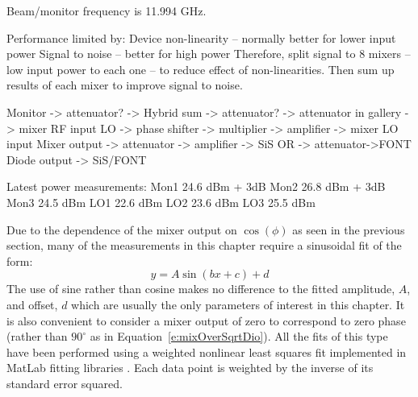 Beam/monitor frequency is 11.994 GHz.

Performance limited by:
Device non-linearity -- normally better for lower input power
Signal to noise -- better for high power
Therefore, split signal to 8 mixers -- low input power to each one -- to reduce effect of non-linearities. Then sum up results of each mixer to improve signal to noise.

Monitor -> attenuator? -> Hybrid sum -> attenuator? -> attenuator in gallery -> mixer RF input
LO -> phase shifter -> multiplier -> amplifier -> mixer LO input
Mixer output -> attenuator -> amplifier -> SiS OR -> attenuator->FONT
Diode output -> SiS/FONT

Latest power measurements:
Mon1 24.6 dBm + 3dB
Mon2 26.8 dBm + 3dB
Mon3 24.5 dBm
LO1 22.6 dBm
LO2 23.6 dBm
LO3 25.5 dBm


Due to the dependence of the mixer output on \(\cos(\phi)\) as seen in the previous section, many of the measurements in this chapter require a sinusoidal fit of the form:
\begin{equation}
y = A\sin(bx + c) + d
\label{e:generalSinEq}
\end{equation}
The use of sine rather than cosine makes no difference to the fitted amplitude, \(A\), and offset, \(d\) which are usually the only parameters of interest in this chapter. It is also convenient to consider a mixer output of zero to correspond to zero phase (rather than \(90^\circ\) as in Equation~\ref{e:mixOverSqrtDio}). All the fits of this type have been performed using a weighted nonlinear least squares fit implemented in MatLab fitting libraries \cite{MatLabFit}. Each data point is weighted by the inverse of its standard error squared.

